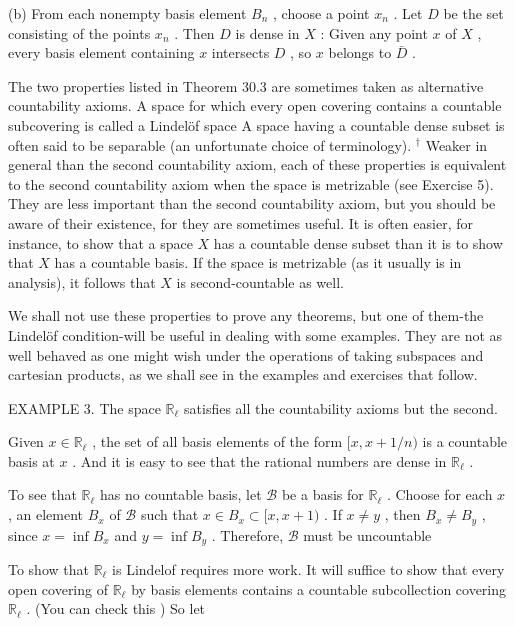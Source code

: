(b) From each nonempty basis element \({B}_{n}\) , choose a point \({x}_{n}\) . Let \(D\) be the set consisting of the points \({x}_{n}\) . Then \(D\) is dense in \(X\) : Given any point \(x\) of \(X\) , every basis element containing \(x\) intersects \(D\) , so \(x\) belongs to \(\bar{D}\) .

The two properties listed in Theorem 30.3 are sometimes taken as alternative countability axioms. A space for which every open covering contains a countable subcovering is called a Lindelöf space A space having a countable dense subset is often said to be separable (an unfortunate choice of terminology). \({}^{ \dagger  }\) Weaker in general than the second countability axiom, each of these properties is equivalent to the second countability axiom when the space is metrizable (see Exercise 5). They are less important than the second countability axiom, but you should be aware of their existence, for they are sometimes useful. It is often easier, for instance, to show that a space \(X\) has a countable dense subset than it is to show that \(X\) has a countable basis. If the space is metrizable (as it usually is in analysis), it follows that \(X\) is second-countable as well.

We shall not use these properties to prove any theorems, but one of them-the Lindelöf condition-will be useful in dealing with some examples. They are not as well behaved as one might wish under the operations of taking subspaces and cartesian products, as we shall see in the examples and exercises that follow.

EXAMPLE 3. The space \({\mathbb{R}}_{\ell }\) satisfies all the countability axioms but the second.

Given \(x \in  {\mathbb{R}}_{\ell }\) , the set of all basis elements of the form \(\lbrack x,x + 1/n)\) is a countable basis at \(x\) . And it is easy to see that the rational numbers are dense in \({\mathbb{R}}_{\ell }\) .

To see that \({\mathbb{R}}_{\ell }\) has no countable basis, let \(\mathcal{B}\) be a basis for \({\mathbb{R}}_{\ell }\) . Choose for each \(x\) , an element \({B}_{x}\) of \(\mathcal{B}\) such that \(x \in  {B}_{x} \subset  \lbrack x,x + 1)\) . If \(x \neq  y\) , then \({B}_{x} \neq  {B}_{y}\) , since \(x = \inf {B}_{x}\) and \(y = \inf {B}_{y}\) . Therefore, \(\mathcal{B}\) must be uncountable

To show that \({\mathbb{R}}_{\ell }\) is Lindelof requires more work. It will suffice to show that every open covering of \({\mathbb{R}}_{\ell }\) by basis elements contains a countable subcollection covering \({\mathbb{R}}_{\ell }\) . (You can check this ) So let

